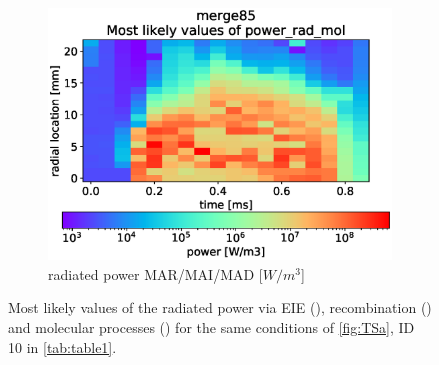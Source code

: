\begin{figure}
\begin{subfigure}{0.48\linewidth}
        \label{fig:bayes_example_1b}
    \end{subfigure}
    \hfill
    \begin{subfigure}{0.48\linewidth}
    	\includegraphics[width=\linewidth,trim={0 30 0 45},clip]{Chapters/chapter3/figs/_merge85_global_fit_example4.eps}
         \caption{radiated power MAR/MAI/MAD [$W/m^3$]}
        \label{fig:bayes_example_1c}
    \end{subfigure}
	\caption{Most likely values of the radiated power via EIE (), recombination () and molecular processes () for the same conditions of \autoref{fig:TSa}, ID 10 in \autoref{tab:table1}.}
    \label{fig:bayes_example_1}
\end{figure}

